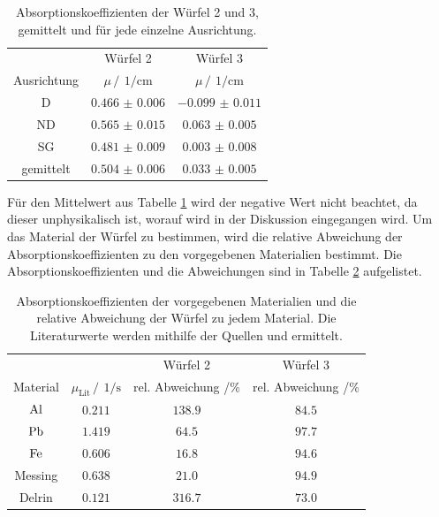 \FloatBarrier
\begin{table}
    \centering
    \caption{Absorptionskoeffizienten der Würfel 2 und 3, gemittelt und für jede einzelne Ausrichtung.}
    \label{tab:Absorptionskoeffizienten_1_2}
    \begin{tabular}{c c c}
        \toprule
        &Würfel 2&Würfel 3\\
        \cmidrule(lr){2-2}\cmidrule(lr){3-3}
        Ausrichtung&$\mu \,/\,\SI{}{1\per\centi\meter}$&$\mu \,/\,\SI{}{1\per\centi\meter}$\\
        \midrule
        D &$\num{0.466(6)}$&$\num{-0.099(11)}$\\
        ND&$\num{0.565(15)}$&$\num{0.063(5)}$\\
        SG&$\num{0.481(9)}$&$\num{0.003(8)}$\\
        \midrule
        gemittelt&$\num{0.504(6)}$&$\num{0.033(5)}$\\
        \bottomrule
    \end{tabular}
\end{table}
\FloatBarrier

Für den Mittelwert aus Tabelle \ref{tab:Absorptionskoeffizienten_1_2} wird der negative Wert nicht beachtet, da dieser unphysikalisch ist,
worauf wird in der Diskussion eingegangen wird. Um das Material der Würfel zu bestimmen, wird die relative Abweichung der Absorptionskoeffizienten zu 
den vorgegebenen Materialien bestimmt. Die Absorptionskoeffizienten und die Abweichungen sind in Tabelle \ref{tab:Abweichung23}
aufgelistet.

\FloatBarrier
\begin{table}
    \centering
    \caption{Absorptionskoeffizienten der vorgegebenen Materialien und die relative Abweichung der Würfel zu jedem Material. Die 
    Literaturwerte werden mithilfe der Quellen \cite{Massenkoef} und \cite{Dichte} ermittelt.}
    \label{tab:Abweichung23}
    \begin{tabular}{c c c c}
        \toprule
        &&Würfel 2& Würfel 3\\
        \cmidrule(lr){3-3}\cmidrule(lr){4-4}
        Material&$\mu_{\text{Lit}}\,/\,\SI{}{1\per\second}$&rel. Abweichung /\%&rel. Abweichung /\%\\
        \midrule
        $\ce{Al}$&$\num{0.211}$&$\num{138.9}$&$\num{84.5}$\\
        $\ce{Pb}$&$\num{1.419}$&$\num{64.5}$&$\num{97.7}$\\
        $\ce{Fe}$&$\num{0.606}$&$\num{16.8}$&$\num{94.6}$\\
        Messing  &$\num{0.638}$&$\num{21.0}$&$\num{94.9}$\\ 
        Delrin   &$\num{0.121}$&$\num{316.7}$&$\num{73.0}$\\
        \bottomrule
    \end{tabular}
\end{table}
\FloatBarrier

